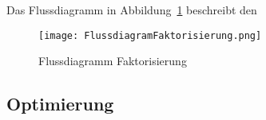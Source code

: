 \vspace{1em}

Das Flussdiagramm in Abbildung~\ref{fig:Flussdiagramm} beschreibt den 

\begin{figure} [H]
\caption{Flussdiagramm Faktorisierung}
\label{fig:Flussdiagramm}
\texttt{[image: FlussdiagramFaktorisierung.png]}
\centering
\end{figure}

\subsection{Optimierung} \label{Optimierung}


